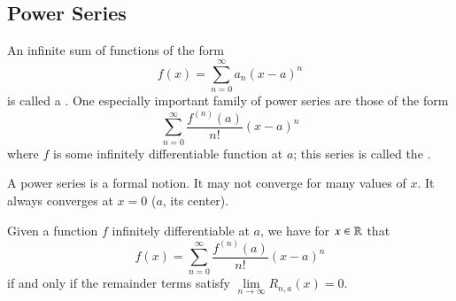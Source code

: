 \subsection{Power Series}


\begin{definition}
    An infinite sum of functions of the form \begin{equation*}
        f(x) = \sum\limits_{n=0}^{\infty}a_n(x-a)^n
    \end{equation*}
    is called a . One especially important family of power series are those of the form \begin{equation*}
        \sum\limits_{n=0}^{\infty}\frac{f^{(n)}(a)}{n!}(x-a)^n
    \end{equation*}
    where $f$ is some infinitely differentiable function at $a$; this series is called the .
\end{definition}

A power series is a formal notion. It may not converge for many values of $x$. It always converges at $x = 0$ ($a$, its center).


\begin{remark}
    Given a function $f$ infinitely differentiable at $a$, we have for $x \in \mathbb R$ that \begin{equation*}
        f(x) = \sum\limits_{n=0}^{\infty}\frac{f^{(n)}(a)}{n!}(x-a)^n
    \end{equation*}
    if and only if the remainder terms satisfy $\lim\limits_{n\rightarrow \infty}R_{n,a}(x) = 0$.
\end{remark}


